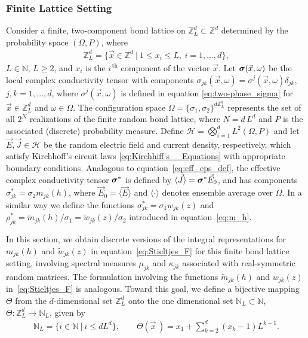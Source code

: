 \documentclass{cmslatex}
\newcommand\bsig{\mbox{\boldmath${\sigma}$}}
\begin{document}
\subsubsection{Finite Lattice Setting}
\label{sec:Finite_Lattice_Setting}
%
Consider a finite, two-component bond lattice on
$\mathbb{Z}_L^d\subset\mathbb{Z}^d$ determined by the probability space
$(\Omega,P)$, where
%
\begin{align}\label{eq:ZLd}
  \mathbb{Z}_L^d=\{\vec{x}\in\mathbb{Z}^d \ | \ 1\leq x_i\leq L, \ i=1,\ldots,d\},   
\end{align}
%
$L\in\mathbb{N}$, $L\geq2$, and $x_i$ is the $i^{\,\text{th}}$
component of the vector $\vec{x}$. Let $\bsig(\vec{x},\omega)$ be the local
complex conductivity tensor with components
$\sigma_{jk}(\vec{x},\omega)=\sigma^j(\vec{x},\omega)\delta_{jk}$, $j,k=1,\ldots,d$, where
$\sigma^j(\vec{x},\omega)$ is defined in equation \eqref{eq:two-phase_sigma} for
$\vec{x}\in \mathbb{Z}_L^d$ and $\omega\in\Omega$. The configuration space
$\Omega=\{\sigma_1,\sigma_2\}^{d\mathbb{Z}_L^d}$ represents the set of all $2^N$
realizations of the finite random bond lattice, where $N=d\,L^d$ and
$P$ is the associated (discrete) probability measure. Define
$\mathscr{H}=\bigotimes_{i=1}^dL^2(\Omega,P)$ and let
$\vec{E},\vec{J}\in \mathscr{H}$ be the random
electric field and current density, respectively, which satisfy
Kirchhoff's circuit laws \eqref{eq:Kirchhiff's__Equations} with
appropriate boundary conditions. Analogous to
equation~\eqref{eq:eff_eps_def}, the effective complex conductivity
tensor $\bsig^*$ is defined by $\langle\vec{J}\rangle=\bsig^*\vec{E}_0$, and
has components $\sigma_{jk}^*=\sigma_2m_{jk}(h)$, where $\vec{E}_0=\langle\vec{E}\rangle$ and
$\langle\cdot\rangle$ denotes ensemble average over $\Omega$. In a similar way we define
the functions $\sigma_{jk}^*=\sigma_1w_{jk}(z)$ and
$\rho^*_{jk}=\tilde{m}_{jk}(h)/\sigma_1=\tilde{w}_{jk}(z)/\sigma_2$ introduced in
equation~\eqref{eq:m_h}.  




In this section, we obtain discrete versions of the integral
representations for $m_{jk}(h)$ and $\tilde{w}_{jk}(z)$ in
equation~\eqref{eq:Stieltjes_F} for this finite bond lattice setting,
involving spectral measures $\mu_{jk}$ and $\kappa_{jk}$ associated with
real-symmetric random matrices. The formulation involving the functions
$\tilde{m}_{jk}(h)$ and $w_{jk}(z)$ in~\eqref{eq:Stieltjes_F} is
analogous. Toward this goal, 
we define a bijective mapping $\Theta$ from the $d$-dimensional set
$\mathbb{Z}_L^d$ onto the one dimensional set
$\mathbb{N}_L\subset\mathbb{N}$, $\Theta:\mathbb{Z}_L^d\to\mathbb{N}_L$, given by
% 
\begin{align}\label{eq:Bijection_Z_N}
  \mathbb{N}_L=\{i\in\mathbb{N} \ | \ i\leq dL^d\}, \qquad
  \Theta(\vec{x}\,)=x_1+\sum_{k=2}^d(x_k-1)L^{k-1}.
\end{align}
%
\end{document}
